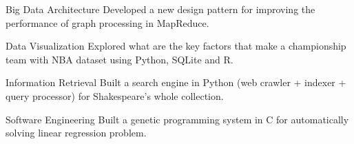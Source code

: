 \begin{cvskills}

  \cvskill
    {Big Data Architecture} %
    {Developed a new design pattern for improving the performance of graph
    processing in MapReduce.} %

  \cvskill
    {Data Visualization} %
    {Explored what are the key factors that make a championship team
    with NBA dataset using Python, SQLite and R.} %

  \cvskill
    {Information Retrieval} %
    {Built a search engine in Python (web crawler + indexer + query
    processor) for Shakespeare's whole collection.} %

  \cvskill
    {Software Engineering} %
    {Built a genetic programming system in C for automatically solving
    linear regression problem.}

\end{cvskills}
